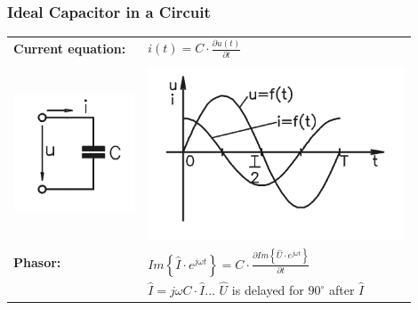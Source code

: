 \documentclass{beamer}
\begin{document}
	\begin{frame}
    \frametitle{Ideal Capacitor in a Circuit}
		\begin{center}
		\begin{tabular}{m{0.3\linewidth} m{0.6\linewidth}}
			\textbf{Current equation:} 					& $i\left(t\right)= C\cdot \frac{\partial u\left(t\right)}{\partial t}$\\\\
			\includegraphics[scale=0.4]{obr06_obvodKond.png}	& \includegraphics[scale=0.5]{obr07_obvodKondGraf.png}\\
			\textbf{Phasor:}						& $Im\left\{\hat{I}\cdot e^{j\omega t}\right\} = C\cdot \frac{\partial Im\left\{\hat{U}\cdot e^{j\omega t}\right\}}{\partial t}$\\
																	& $\hat{I} = j\omega C \cdot \hat{I}$... $\hat{U}$ is delayed for $90^\circ$ after $\hat{I}$
		\end{tabular}
		\end{center}
  \end{frame}
\end{document}
